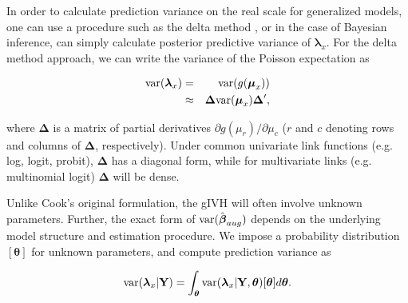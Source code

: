 \documentclass[12pt,fleqn]{article}
\begin{document}
\begin{flushleft}
In order to calculate prediction variance on the real scale for generalized models, one can use a procedure such as the delta method \citep{Dorfman1938}, or in the case of Bayesian inference, can simply calculate posterior predictive variance of $\boldsymbol{\lambda}_x$.  For the delta method approach, we can write the variance of the Poisson expectation as
\begin{linenomath*}
\begin{eqnarray}
  \label{eq:var-lambda}
  {\rm var}(\boldsymbol{\lambda}_x) & = & {\rm var}(g(\boldsymbol{\mu}_x)) \\
  & \approx & \boldsymbol{\Delta} {\rm var}(\boldsymbol{\mu}_x)\boldsymbol{\Delta}^\prime,
\end{eqnarray}
\end{linenomath*}
where $\boldsymbol{\Delta}$ is a matrix of partial derivatives $\partial g(\mu_r)/\partial \mu_c$ ($r$ and $c$ denoting rows and columns of $\boldsymbol{\Delta}$, respectively).  Under common univariate link functions (e.g. log, logit, probit), $\boldsymbol{\Delta}$ has a diagonal form, while for multivariate links (e.g. multinomial logit) $\boldsymbol{\Delta}$ will be dense.

\hspace{.5in} Unlike Cook's original formulation, the gIVH will often involve unknown parameters.  Further, the exact form of ${\rm var}(\hat{\boldsymbol{\beta}}_{aug})$ depends on the underlying model structure and estimation procedure.  We impose a probability distribution $[\boldsymbol{\theta}]$ for unknown parameters, and compute prediction variance as
\begin{linenomath*}
\begin{equation}
  \label{eq:E_var_lambda}
  {\rm var}(\boldsymbol{\lambda}_x | {\bf Y}) = \int_{\boldsymbol{\theta}} {\rm var}(\boldsymbol{\lambda}_x | {\bf Y}, \boldsymbol{\theta}) [\boldsymbol{\theta}] d \boldsymbol{\theta}.
\end{equation}
\end{linenomath*}


\end{flushleft}
\end{document}
